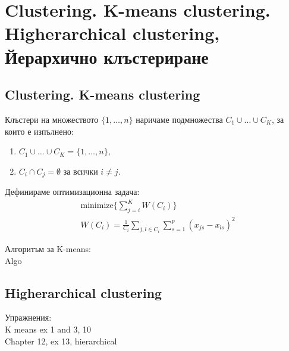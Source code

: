 \section{Clustering. K-means clustering. Higherarchical clustering, Йерархично клъстериране}	
	\subsection{Clustering. K-means clustering}
	\begin{definition}
		Клъстери на множеството $\{1, \dots, n\}$ наричаме подмножества $C_1 \cup \dots \cup C_K$, за които е изпълнено:
		\begin{enumerate}
			\item $C_1 \cup \dots \cup C_K = \{1, \dots, n\} ,$ 
			\item $C_i \cap C_j = \emptyset $ за всички $i \neq j.$
		\end{enumerate}
	\end{definition}

	Дефинираме оптимизационна задача:\\
	\begin{align}
	& \text{minimize} \Big\{ \sum_{j=i}^K W(C_i) \Big\} \\
		& W(C_i) = \frac{1}{C_i} \sum_{j,l \in C_i} \sum_{s=1}^p (x_{js}-x_{ls}) ^2
	\end{align}

	Алгоритъм за K-means: \\
	Algo \\
	\subsection{Higherarchical clustering}


	Упражнения: \\
	K means ex 1 and 3, 10 \\
	Chapter 12, ex 13, hierarchical \\ 


\cite{hastie01statisticallearning}


\newpage
